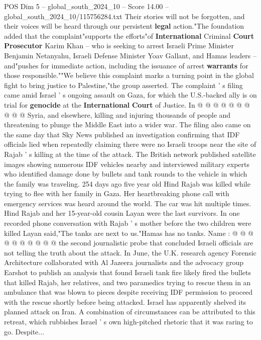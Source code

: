 \begin{textsample}{POS Dim 5 – global\_south\_2024\_10 – Score 14.00 – global\_south\_2024\_10/115756284.txt}
Their stories will not be forgotten, and their voices will be heard through our persistent \textbf{legal} action."The foundation added that the complaint"supports the efforts"of \textbf{International} Criminal \textbf{Court} \textbf{Prosecutor} Karim Khan -- who is seeking to arrest Israeli Prime Minister Benjamin Netanyahu, Israeli Defense Minister Yoav Gallant, and Hamas leaders -- and"pushes for immediate action, including the issuance of arrest \textbf{warrants} for those responsible.""We believe this complaint marks a turning point in the global fight to bring justice to Palestine,"the group asserted.
The complaint ' s filing came amid Israel ' s ongoing assault on Gaza, for which the U.S.-backed ally is on trial for \textbf{genocide} at the \textbf{International} \textbf{Court} of Justice.
In @ @ @ @ @ @ @ @ @ @ Syria, and elsewhere, killing and injuring thousands of people and threatening to plunge the Middle East into a wider war.
The filing also came on the same day that Sky News published an investigation confirming that IDF officials lied when repeatedly claiming there were no Israeli troops near the site of Rajab ' s killing at the time of the attack.
The British network published satellite images showing numerous IDF vehicles nearby and interviewed military experts who identified damage done by bullets and tank rounds to the vehicle in which the family was traveling. 254 days ago five year old Hind Rajab was killed while trying to flee with her family in Gaza.
Her heartbreaking phone call with emergency services was heard around the world.
The car was hit multiple times.
Hind Rajab and her 15-year-old cousin Layan were the last survivors.
In one recorded phone conversation with Rajab ' s mother before the two children were killed Layan said,"The tanks are next to us."Hamas has no tanks.
Name : @ @ @ @ @ @ @ @ @ @ the second journalistic probe that concluded Israeli officials are not telling the truth about the attack.
In June, the U.K. research agency Forensic Architecture collaborated with Al Jazeera journalists and the advocacy group Earshot to publish an analysis that found Israeli tank fire likely fired the bullets that killed Rajab, her relatives, and two paramedics trying to rescue them in an ambulance that was blown to pieces despite receiving IDF permission to proceed with the rescue shortly before being attacked.
Israel has apparently shelved its planned attack on Iran.
A combination of circumstances can be attributed to this retreat, which rubbishes Israel ' s own high-pitched rhetoric that it was raring to go.
Despite...

\end{textsample}
